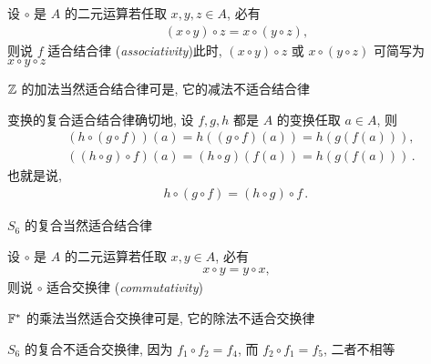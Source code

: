 \begin{definition}
    设 $\circ$ 是 $A$ 的二元运算\period 若任取 $x,y,z \in A$, 必有
    \begin{align*}
        (x \circ y) \circ z = x \circ (y \circ z),
    \end{align*}
    则说 $f$ 适合结合律 (\textit{associativity})\period 此时, $(x \circ y) \circ z$ 或 $x \circ (y \circ z)$ 可简写为 $x \circ y \circ z$\period
\end{definition}

\begin{example}
    $\mathbb{Z}$ 的加法当然适合结合律\period 可是, 它的减法不适合结合律\period
\end{example}

\begin{remark}
    变换的复合适合结合律\period 确切地, 设 $f,g,h$ 都是 $A$ 的变换\period 任取 $a \in A$, 则
    \begin{align*}
         & (h \circ (g \circ f))(a) = h((g \circ f)(a)) = h(g(f(a))),        \\
         & ((h \circ g) \circ f)(a) = (h \circ g)(f(a)) = h(g(f(a))) \period
    \end{align*}
    也就是说,
    \begin{align*}
        h \circ (g \circ f) = (h \circ g) \circ f \period
    \end{align*}
\end{remark}

\begin{example}
    $S_6$ 的复合当然适合结合律\period
\end{example}

\begin{definition}
    设 $\circ$ 是 $A$ 的二元运算\period 若任取 $x,y \in A$, 必有
    \begin{align*}
        x \circ y = y \circ x,
    \end{align*}
    则说 $\circ$ 适合交换律 (\textit{commutativity})\period
\end{definition}

\begin{example}
    $\mathbb{F}^{\ast}$ 的乘法当然适合交换律\period 可是, 它的除法不适合交换律\period
\end{example}

\begin{example}
    $S_6$ 的复合不适合交换律, 因为 $f_1 \circ f_2 = f_4$, 而 $f_2 \circ f_1 = f_5$, 二者不相等\period
\end{example}

